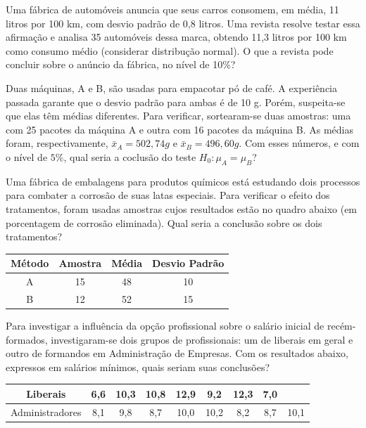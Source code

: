\documentclass{report}
\begin{document}
\begin{Exercise}
\Question Uma fábrica de automóveis anuncia que seus carros consomem, em média, 11 litros por 100 km, com desvio padrão de 0,8 litros. Uma revista resolve testar essa 
afirmação e analisa 35 automóveis dessa marca, obtendo 11,3 litros por 100 km como consumo médio (considerar distribução normal). O que a revista pode concluir 
sobre o anúncio da fábrica, no nível de 10\%?

\Question Duas máquinas, A e B, são usadas para empacotar pó de café. A experiência passada garante que o desvio padrão para ambas é de 10 g. Porém, suspeita-se 
que elas têm médias diferentes. Para verificar, sortearam-se duas amostras: uma com 25 pacotes da máquina A e outra com 16 pacotes da máquina B. As médias foram, 
respectivamente, $\bar x_A = 502,74g$ e $\bar x_B = 496,60 g$.  Com esses números, e com o nível de $5\%$, qual seria a coclusão do teste $H_0: \mu_A = \mu_B$?

\Question Uma fábrica de embalagens para produtos químicos está estudando dois processos para combater a corrosão de suas latas especiais. Para verificar o efeito dos 
tratamentos, foram usadas amostras cujos resultados estão no quadro abaixo (em porcentagem de corrosão eliminada). Qual seria a conclusão sobre os dois tratamentos?

\begin{tabular}{cccc}\\ \hline
Método & Amostra & Média & Desvio Padrão \\ \hline
A & 15 & 48 & 10 \\
B & 12 & 52 & 15 \\ \hline
\end{tabular}

\Question \item Para investigar a influência da opção profissional sobre o salário inicial de recém-formados, investigaram-se dois grupos de profissionais: um de liberais em geral 
e outro de formandos em Administração de Empresas. Com os resultados abaixo, expressos em salários mínimos, quais seriam suas conclusões?

\begin{tabular}{ccccccccc}\\ \hline
Liberais & 6,6 & 10,3 & 10,8 & 12,9 & 9,2 & 12,3 & 7,0 &  \\ \hline
Administradores & 8,1 & 9,8 & 8,7 & 10,0 & 10,2 & 8,2 & 8,7 & 10,1 \\ \hline
\end{tabular}

\newpage


\end{Exercise}
\end{document}
